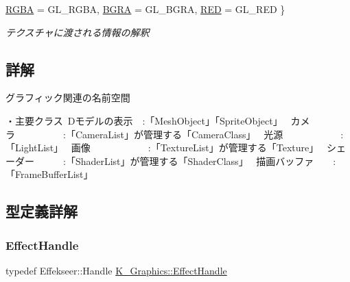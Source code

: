 \begin{DoxyCompactItemize}
\mbox{\hyperlink{namespace_k___graphics_a9654dafb2cd6eaed24a292a6f8373955a535fd8e72dc86d416c6a3f32923645d2}{R\+G\+BA}} = G\+L\+\_\+\+R\+G\+BA, 
\newline
\mbox{\hyperlink{namespace_k___graphics_a9654dafb2cd6eaed24a292a6f8373955ad1ca23636fb9354fdba2dac99e77f1f9}{B\+G\+RA}} = G\+L\+\_\+\+B\+G\+RA, 
\mbox{\hyperlink{namespace_k___graphics_a9654dafb2cd6eaed24a292a6f8373955a73b900220ca74e26dbc87b5baea6dd9c}{R\+ED}} = G\+L\+\_\+\+R\+ED
 \}
\begin{DoxyCompactList}\small\item\em テクスチャに渡される情報の解釈 \end{DoxyCompactList}\end{DoxyCompactItemize}


\subsection{詳解}
グラフィック関連の名前空間~\newline


・主要クラス~\+Dモデルの表示　\+:「\+Mesh\+Object」「\+Sprite\+Object」~\newline
カメラ　　　　　\+:「\+Camera\+List」が管理する「\+Camera\+Class」~\newline
光源　　　　　　\+:「\+Light\+List」~\newline
画像　　　　　　\+:「\+Texture\+List」が管理する「\+Texture」~\newline
シェーダー　　　\+:「\+Shader\+List」が管理する「\+Shader\+Class」~\newline
描画バッファ　　\+:「\+Frame\+Buffer\+List」~\newline
 

\subsection{型定義詳解}
\mbox{\label{namespace_k___graphics_afb3a0fd0adc77eb95104e697c9b6b7a9}} 
\subsubsection{\texorpdfstring{Effect\+Handle}{EffectHandle}}
{\footnotesize\ttfamily typedef Effekseer\+::\+Handle \mbox{\hyperlink{namespace_k___graphics_afb3a0fd0adc77eb95104e697c9b6b7a9}{K\+\_\+\+Graphics\+::\+Effect\+Handle}}}



